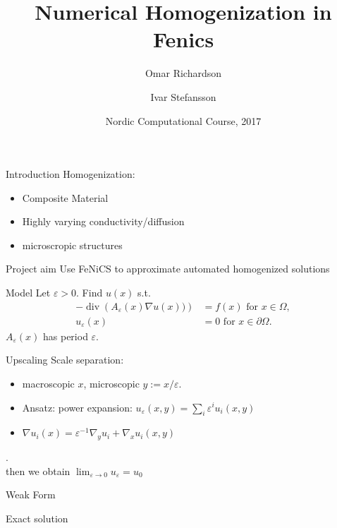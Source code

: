 \documentclass{beamer}
\title[Numerical homogenization]{Numerical Homogenization in Fenics}
\author[O. Richardson \and I. Stefansson] %
{Omar Richardson \and Ivar Stefansson}
\institute %
{
    Karlstad University, Sweden \and University of Bergen, Norway
}
\date[]{Nordic Computational Course, 2017}
\renewcommand{\div}[1]{\operatorname{div}\left( #1 \right)}
\begin{document}
  \frame{\titlepage}
\begin{frame}{Introduction}
  Homogenization:
  \begin{itemize}
    \item Composite Material
    \item Highly varying conductivity/diffusion
    \item microscropic structures
  \end{itemize}
\end{frame}

\begin{frame}[t]{Project aim}
    Use FeNiCS to approximate automated homogenized solutions
\end{frame}

\begin{frame}[t]{Model}
    Let $\varepsilon>0$. Find $u(x)$ s.t.
    \begin{equation}
        \begin{split}
            -\div{A_\varepsilon(x)\nabla u(x))} &= f(x) \mbox{ for } x \in \Omega,\\
            u_\varepsilon(x) &= 0 \mbox{ for } x \in \partial\Omega.
        \end{split}
        \label{eq:model}
    \end{equation}
     $A_\varepsilon(x)$ has period $\varepsilon$.

\end{frame}

\begin{frame}[t]{Upscaling}
    Scale separation: \begin{itemize}
        \item macroscopic $ x$, microscopic $y:= x/\varepsilon$.
        \item Ansatz: power expansion: $u_\varepsilon(x,y) = \sum_i \varepsilon^i u_i(x,y)$
        \item $\nabla u_i(x) = \varepsilon^{-1}\nabla_yu_i + \nabla_xu_i(x,y)$
    \end{itemize}
    .\\
    then we obtain $\lim_{\varepsilon\to 0} u_\varepsilon = u_0$
\end{frame}



\begin{frame}[t]{Weak Form}

\end{frame}

\begin{frame}[t]{Exact solution}

\end{frame}
\end{document}
